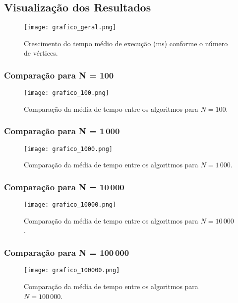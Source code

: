 \documentclass[12pt]{article}
\begin{document}
\subsection{Visualização dos Resultados}

\begin{figure}[H]
    \centering
    \texttt{[image: grafico\_geral.png]}
    \caption{Crescimento do tempo médio de execução (ms) conforme o número de vértices.}
    \label{fig:grafico_geral}
\end{figure}

\subsubsection{Comparação para N = 100}
\begin{figure}[H]
    \centering
    \texttt{[image: grafico\_100.png]}
    \caption{Comparação da média de tempo entre os algoritmos para $N = 100$.}
    \label{fig:grafico_100}
\end{figure}

\subsubsection{Comparação para N = 1\,000}
\begin{figure}[H]
    \centering
    \texttt{[image: grafico\_1000.png]}
    \caption{Comparação da média de tempo entre os algoritmos para $N = 1\,000$.}
    \label{fig:grafico_1000}
\end{figure}

\subsubsection{Comparação para N = 10\,000}
\begin{figure}[H]
    \centering
    \texttt{[image: grafico\_10000.png]}
    \caption{Comparação da média de tempo entre os algoritmos para $N = 10\,000$.}
    \label{fig:grafico_10000}
\end{figure}

\subsubsection{Comparação para N = 100\,000}
\begin{figure}[H]
    \centering
    \texttt{[image: grafico\_100000.png]}
    \caption{Comparação da média de tempo entre os algoritmos para $N = 100\,000$.}
    \label{fig:grafico_100000}
\end{figure}
\end{document}

